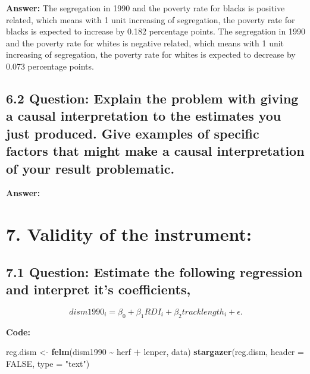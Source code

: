 \documentclass[
]{article}
\newenvironment{Shaded}{\begin{snugshade}}{\end{snugshade}}
\newcommand{\AttributeTok}[1]{\textcolor[rgb]{0.13,0.29,0.53}{#1}}
\newcommand{\ConstantTok}[1]{\textcolor[rgb]{0.56,0.35,0.01}{#1}}
\newcommand{\FunctionTok}[1]{\textcolor[rgb]{0.13,0.29,0.53}{\textbf{#1}}}
\newcommand{\NormalTok}[1]{#1}
\newcommand{\OtherTok}[1]{\textcolor[rgb]{0.56,0.35,0.01}{#1}}
\newcommand{\SpecialCharTok}[1]{\textcolor[rgb]{0.81,0.36,0.00}{\textbf{#1}}}
\newcommand{\StringTok}[1]{\textcolor[rgb]{0.31,0.60,0.02}{#1}}
\begin{document}
\textbf{Answer:} The segregation in 1990 and the poverty rate for blacks
is positive related, which means with 1 unit increasing of segregation,
the poverty rate for blacks is expected to increase by 0.182 percentage
points. The segregation in 1990 and the poverty rate for whites is
negative related, which means with 1 unit increasing of segregation, the
poverty rate for whites is expected to decrease by 0.073 percentage
points.

\clearpage

\hypertarget{question-explain-the-problem-with-giving-a-causal-interpretation-to-the-estimates-you-just-produced.-give-examples-of-specific-factors-that-might-make-a-causal-interpretation-of-your-result-problematic.}{%
\subsection{6.2 Question: Explain the problem with giving a causal
interpretation to the estimates you just produced. Give examples of
specific factors that might make a causal interpretation of your result
problematic.}\label{question-explain-the-problem-with-giving-a-causal-interpretation-to-the-estimates-you-just-produced.-give-examples-of-specific-factors-that-might-make-a-causal-interpretation-of-your-result-problematic.}}

\textbf{Answer:}

\clearpage

\hypertarget{validity-of-the-instrument}{%
\section{7. Validity of the
instrument:}\label{validity-of-the-instrument}}

\hypertarget{question-estimate-the-following-regression-and-interpret-its-coefficients}{%
\subsection{7.1 Question: Estimate the following regression and
interpret it's
coefficients,}\label{question-estimate-the-following-regression-and-interpret-its-coefficients}}

\[
 dism1990_i=\beta_0+\beta_1RDI_i+\beta_2 tracklength_i+\epsilon.
\]

\textbf{Code:}

\begin{Shaded}
\begin{Highlighting}[]
\NormalTok{reg.dism }\OtherTok{\textless{}{-}} \FunctionTok{felm}\NormalTok{(dism1990 }\SpecialCharTok{\textasciitilde{}}\NormalTok{ herf }\SpecialCharTok{+}\NormalTok{ lenper, data)}
\FunctionTok{stargazer}\NormalTok{(reg.dism, }\AttributeTok{header =} \ConstantTok{FALSE}\NormalTok{, }\AttributeTok{type =} \StringTok{"text"}\NormalTok{)}
\end{Highlighting}
\end{Shaded}
\end{document}
